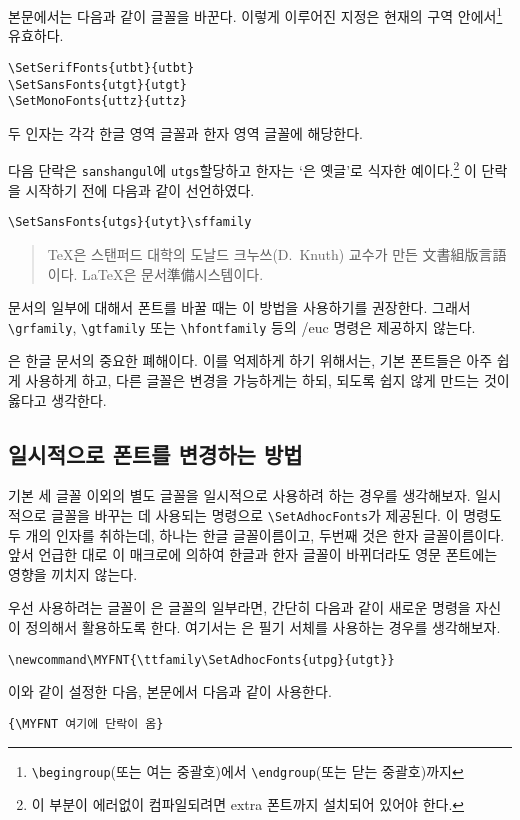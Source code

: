 \bigskip

본문에서는 다음과 같이 글꼴을 바꾼다.
이렇게 이루어진 지정은 현재의 구역 안에서\footnote{%
	\texttt{\textbackslash begingroup}(또는 여는 중괄호)에서
	\texttt{\textbackslash endgroup}(또는 닫는 중괄호)까지} 
유효하다.

\begin{Verbatim}[fontsize=\small]
\SetSerifFonts{utbt}{utbt}
\SetSansFonts{utgt}{utgt}
\SetMonoFonts{uttz}{uttz}
\end{Verbatim}
두 인자는 각각 한글 영역 글꼴과 한자 영역 글꼴에 해당한다.

다음 단락은 \texttt{sanshangul}에 \texttt{utgs}\을 할당하고
한자는 `은 옛글'로 식자한 예이다.\footnote{%
 이 부분이 에러없이 컴파일되려면 extra 폰트까지 설치되어 있어야 한다.
}
이 단락을 시작하기 전에 다음과 같이 선언하였다.
\begin{Verbatim}[fontsize=\small]
\SetSansFonts{utgs}{utyt}\sffamily
\end{Verbatim}

\begin{quote}
\sffamily
\TeX 은 스탠퍼드 대학의 도날드 크누쓰(D.\ Knuth) 교수가
만든 文書組版言語이다. \LaTeX 은 문서準備시스템이다.
\end{quote}

문서의 일부에 대해서 폰트를 바꿀 때는 이 방법을 사용하기를
권장한다. 그래서 \verb|\grfamily|, \verb|\gtfamily| 또는
\verb|\hfontfamily| 등의 \kotex/euc 명령은 제공하지 않는다.

은 한글 문서의 중요한 폐해이다.
이를 억제하게 하기 위해서는, 기본 폰트들은
아주 쉽게 사용하게 하고, 다른 글꼴은 변경을
가능하게는 하되, 되도록 쉽지 않게 만드는 것이 옳다고 생각한다.

\subsection{일시적으로 폰트를 변경하는 방법}

기본 세 글꼴 이외의 별도 글꼴을 일시적으로 사용하려 하는
경우를 생각해보자. 일시적으로 글꼴을 바꾸는 데 사용되는 명령으로
\verb|\SetAdhocFonts|가 제공된다. 이 명령도 두 개의 인자를
취하는데, 하나는 한글 글꼴이름이고, 두번째 것은 한자 글꼴이름이다.
앞서 언급한 대로 이 매크로에 의하여 한글과 한자 글꼴이 바뀌더라도
영문 폰트에는 영향을 끼치지 않는다.

우선 사용하려는 글꼴이 은 글꼴의 일부라면,
간단히 다음과 같이 새로운 명령을 자신이 정의해서 활용하도록 한다.
여기서는 은 필기 서체를 사용하는 경우를 생각해보자.
\begin{Verbatim}[fontsize=\small]
\newcommand\MYFNT{\ttfamily\SetAdhocFonts{utpg}{utgt}}
\end{Verbatim}
이와 같이 설정한 다음, 본문에서 다음과 같이 사용한다.
\begin{Verbatim}[fontsize=\small]
{\MYFNT 여기에 단락이 옴}
\end{Verbatim}

